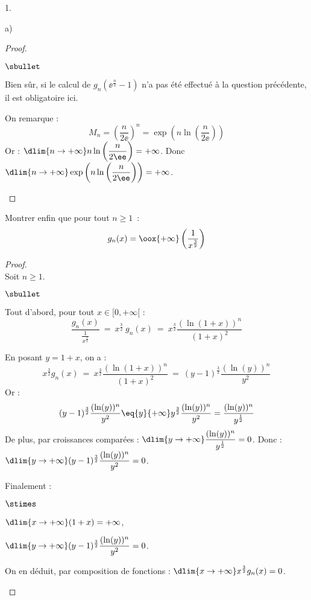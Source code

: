 \documentclass[11pt]{article}%
\begin{document}
\begin{noliste}{1.}
\begin{noliste}{a)}
\begin{proof}
\begin{noliste}{$\sbullet$}
  \begin{remark}
   Bien sûr, si le calcul de $g_n\left(\ee^{\frac{n}{2}}-1\right)$ 
   n'a pas été effectué à la question précédente, il est 
   obligatoire ici.
  \end{remark}

  
  \item On remarque :
  \[
   M_n = \left(\dfrac{n}{2\ee}\right)^n =
   \exp \left(n \ln \left(\dfrac{n}{2\ee}\right)\right)
  \]
  Or : $\dlim{n\to+\infty} n \ln\left(\dfrac{n}{2\ee}\right)=+\infty$. 
  Donc $\dlim{n\to + \infty} \exp \left(n \ln 
  \left(\dfrac{n}{2\ee}\right)\right) = +\infty$.
  ~\\[-1.2cm]
 \end{noliste}
\end{proof}


\newpage


\item Montrer enfin que pour tout $n \geq 1$~:
  \[
  g_n(x)  = \oox{+\infty} \left( 
    \frac{1}{x^{\frac{3}{2}}} \right) 
  \]

  \begin{proof}~\\
    Soit $n\geq 1$.
    \begin{noliste}{$\sbullet$}
    \item Tout d'abord, pour tout $x\in [0,+\infty[$ :
      \[      
      \dfrac{g_n(x)}{\frac{1}{x^{\frac{3}{2}}}} \ = \ x^{\frac{3}{2}}
      \ g_n(x) \ = \ x^{\frac{3}{2}} \dfrac{(\ln(1+x))^n} {(1+x)^2}
      \]

    \item En posant $y = 1+x$, on a :
      \[
      x^{\frac{3}{2}} g_n(x) \ = \ x^{\frac{3}{2}}
      \dfrac{(\ln(1+x))^n} {(1+x)^2} \ = \ (y-1)^{\frac{3}{2}}
      \dfrac{(\ln(y))^n}{y^2}
      \]
      Or :
      \[
      (y-1)^{\frac{3}{2}} \dfrac{(\ln(y))^n}{y^2} \eq{y}{+\infty}
      y^{\frac{3}{2}} \dfrac{(\ln(y))^n}{y^2} =
      \dfrac{(\ln(y))^n}{y^{\frac{1}{2}}}
      \]
      De plus, par croissances comparées : $\dlim{y\to +\infty}
      \dfrac{(\ln(y))^n}{y^{\frac{1}{2}}} = 0$. Donc :
      $\dlim{y\to+\infty} (y-1)^{\frac{3}{2}} \dfrac{(\ln(y))^n}{y^2}
      =0$.

    \item Finalement :
      \begin{noliste}{$\stimes$}
      \item $\dlim{x\to +\infty} (1+x)=+\infty$,
      \item $\dlim{y\to+\infty} (y-1)^{\frac{3}{2}}
        \dfrac{(\ln(y))^n}{y^2} =0$.
      \end{noliste}
      On en déduit, par composition de fonctions : $\dlim{x\to+\infty}
      x^{\frac{3}{2}} g_n(x)=0$.
    \end{noliste}


\end{proof}
\end{noliste}
\end{noliste}
\end{document}

